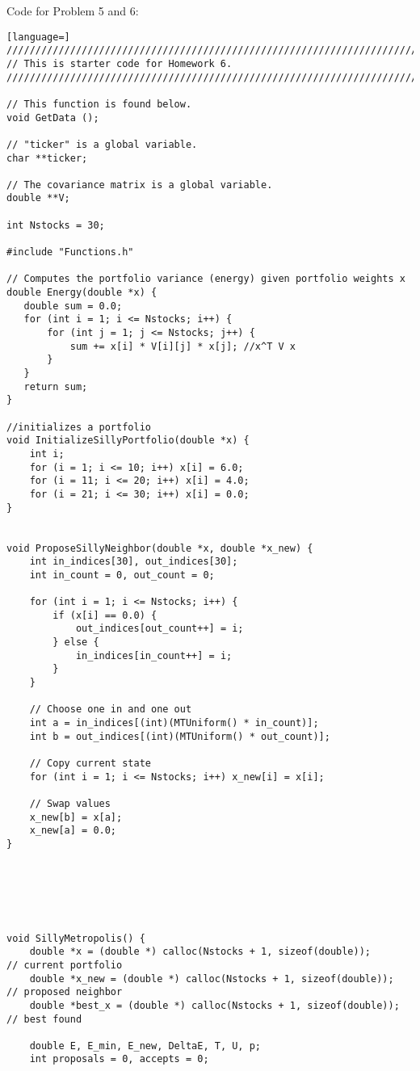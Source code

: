 \documentclass{report}
\begin{document}
Code for Problem 5 and 6:

\begin{lstlisting}[language=]
////////////////////////////////////////////////////////////////////////////////
// This is starter code for Homework 6.
////////////////////////////////////////////////////////////////////////////////

// This function is found below.
void GetData ();

// "ticker" is a global variable.
char **ticker;

// The covariance matrix is a global variable.
double **V;

int Nstocks = 30;

#include "Functions.h"

// Computes the portfolio variance (energy) given portfolio weights x
double Energy(double *x) {
   double sum = 0.0;
   for (int i = 1; i <= Nstocks; i++) {
       for (int j = 1; j <= Nstocks; j++) {
           sum += x[i] * V[i][j] * x[j]; //x^T V x
       }
   }
   return sum;
}

//initializes a portfolio
void InitializeSillyPortfolio(double *x) {
    int i;
    for (i = 1; i <= 10; i++) x[i] = 6.0;
    for (i = 11; i <= 20; i++) x[i] = 4.0;
    for (i = 21; i <= 30; i++) x[i] = 0.0;
}


void ProposeSillyNeighbor(double *x, double *x_new) {
    int in_indices[30], out_indices[30];
    int in_count = 0, out_count = 0;

    for (int i = 1; i <= Nstocks; i++) {
        if (x[i] == 0.0) {
            out_indices[out_count++] = i;
        } else {
            in_indices[in_count++] = i;
        }
    }

    // Choose one in and one out
    int a = in_indices[(int)(MTUniform() * in_count)];
    int b = out_indices[(int)(MTUniform() * out_count)];

    // Copy current state
    for (int i = 1; i <= Nstocks; i++) x_new[i] = x[i];

    // Swap values
    x_new[b] = x[a];
    x_new[a] = 0.0;  
}






void SillyMetropolis() {
    double *x = (double *) calloc(Nstocks + 1, sizeof(double));       // current portfolio
    double *x_new = (double *) calloc(Nstocks + 1, sizeof(double));   // proposed neighbor
    double *best_x = (double *) calloc(Nstocks + 1, sizeof(double));  // best found

    double E, E_min, E_new, DeltaE, T, U, p;
    int proposals = 0, accepts = 0;


\end{lstlisting}
\end{document}
